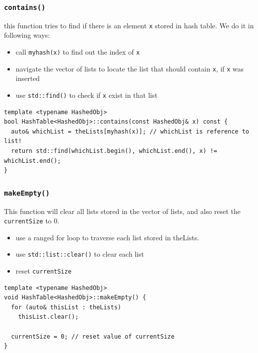\documentclass[12pt]{book}
\begin{document}
\subsubsection{\texttt{contains()}}
\label{sec:org183306f}
this function tries to find if there is an element \texttt{x} stored in hash table. We do it in following ways:
\begin{itemize}
\item call \texttt{myhash(x)} to find out the index of \texttt{x}
\item navigate the vector of lists to locate the list that should contain \texttt{x}, if \texttt{x} was inserted
\item use \texttt{std::find()} to check if \texttt{x} exist in that list
\end{itemize}
\begin{verbatim}
template <typename HashedObj>
bool HashTable<HashedObj>::contains(const HashedObj& x) const {
  auto& whichList = theLists[myhash(x)]; // whichList is reference to list!
  return std::find(whichList.begin(), whichList.end(), x) != whichList.end();
}
\end{verbatim}

\subsubsection{\texttt{makeEmpty()}}
\label{sec:orgb562a2d}
This function will clear all lists stored in the vector of lists, and also reset the \texttt{currentSize} to 0.
\begin{itemize}
\item use a ranged for loop to traverse each list stored in theLists.
\item use \texttt{std::list::clear()} to clear each list
\item reset \texttt{currentSize}
\end{itemize}
\begin{verbatim}
template <typename HashedObj>
void HashTable<HashedObj>::makeEmpty() {
  for (auto& thisList : theLists)
    thisList.clear();

  currentSize = 0; // reset value of currentSize
}
\end{verbatim}
\end{document}
